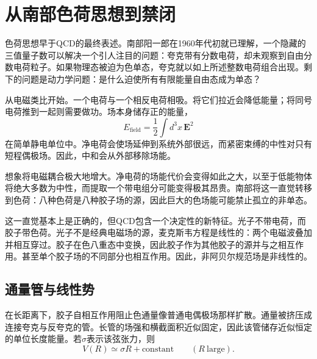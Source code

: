 \begin{classroomqa}
\end{classroomqa}

\section{从南部色荷思想到禁闭}

色荷思想早于QCD的最终表述。南部阳一郎在1960年代初就已理解，一个隐藏的三值量子数可以解决一个引人注目的问题：夸克带有分数电荷，却未观察到自由分数电荷粒子。如果物理态被迫为色单态，夸克就以如上所述整数电荷组合出现。剩下的问题是动力学问题：是什么迫使所有有限能量自由态成为单态？

从电磁类比开始。一个电荷与一个相反电荷相吸。将它们拉近会降低能量；将同号电荷推到一起则需要做功。场本身储存正的能量，
\begin{equation}
E_{\mathrm{field}}
=\frac12\int d^3x\,\boldsymbol E^2
\end{equation}
在简单静电单位中。净电荷会使场延伸到系统外部很远，而紧密束缚的中性对只有短程偶极场。因此，中和会从外部移除场能。

想象将电磁耦合极大地增大。净电荷的场能代价会变得如此之大，以至于低能物体将绝大多数为中性，而提取一个带电组分可能变得极其昂贵。南部将这一直觉转移到色荷：八种色荷是八种胶子场的源，因此巨大的色场能可能禁止孤立的非单态。

这一直觉基本上是正确的，但QCD包含一个决定性的新特征。光子不带电荷，而胶子带色荷。光子不是经典电磁场的源，麦克斯韦方程是线性的：两个电磁波叠加并相互穿过。胶子在色八重态中变换，因此胶子作为其他胶子的源并与之相互作用。甚至单个胶子场的不同部分也相互作用。因此，非阿贝尔规范场是非线性的。

\subsection{通量管与线性势}

在长距离下，胶子自相互作用阻止色通量像普通电偶极场那样扩散。通量被挤压成连接夸克与反夸克的管。长管的场强和横截面积近似固定，因此该管储存近似恒定的单位长度能量。若\(\sigma\)表示该弦张力，则
\begin{equation}
V(R)\simeq\sigma R+\text{constant}
\qquad (R\ \text{large}).
\label{eq:l4-linear-potential}
\end{equation}

